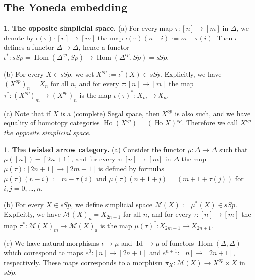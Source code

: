 \documentclass[12pt]{amsart}
\theoremstyle{plain}
\theoremstyle{definition}
\newtheorem{Emp}[Thm]{}
\numberwithin{equation}{section}
\newcommand{\cal}[1]{\mathcal{#1}}
\newcommand{\C}[1]{\cal#1}
\newcommand{\Dt}{\Delta}
\newcommand{\Ho}{\operatorname{Ho}}
\newcommand{\Id}{\operatorname{Id}}
\newcommand{\Hom}{\operatorname{Hom}}
\begin{document}
\subsection{The Yoneda embedding}
\begin{Emp} \label{E:opp}
{\bf The opposite simplicial space.} (a) For every map 
$\tau:[n]\to[m]$ in $\Dt$, we denote by $\iota(\tau):[n]\to[m]$
the map $\iota(\tau)(n-i):=m-\tau(i)$. Then $\iota$ defines a
functor $\Dt\to\Dt$, hence a functor
$\iota^*:sSp=\Hom(\Dt^{op},Sp)\to \Hom(\Dt^{op},Sp)=sSp$.

(b) For every  $X\in sSp$, we set $X^{op}:=\iota^*(X)\in sSp$.
Explicitly, we have $(X^{op})_{n}=X_n$ for all $n$, and for every
$\tau:[n]\to[m]$ the map $\tau^*:(X^{op})_{m}\to (X^{op})_{n}$ is
the map $\iota(\tau)^*:X_m\to X_n$.

(c) Note that if $X$ is a (complete) Segal space, then $X^{op}$ 
is also such, and we have equality of homotopy categories $\Ho
(X^{op})=(\Ho X)^{op}$. Therefore we call $X^{op}$ {\em the
opposite simplicial space}.
\end{Emp}

\begin{Emp} \label{E:catmor}
{\bf The twisted arrow category.} (a) Consider the functor
$\mu:\Dt\to\Dt$ such that $\mu([n])=[2n+1]$, and for every
$\tau:[n]\to[m]$ in $\Dt$ the map $\mu(\tau):[2n+1]\to[2m+1]$ is
defined by formulas $\mu(\tau)(n-i):=m-\tau(i)$ and
$\mu(\tau)(n+1+j)=(m+1+\tau(j))$ for $i,j=0,\ldots,n$.

(b)  For every  $X\in sSp$, we define simplicial space
$\C{M}(X):=\mu^*(X)\in sSp$. Explicitly, we have
$\C{M}(X)_{n}=X_{2n+1}$ for all $n$, and for every $\tau:[n]\to[m]$
the map $\tau^*:\C{M}(X)_{m}\to \C{M}(X)_{n}$ is the map
$\mu(\tau)^*:X_{2m+1}\to X_{2n+1}$.

(c) We have natural morphisms $\iota\to \mu$ and  $\Id\to\mu$ of
functors $\Hom(\Dt,\Dt)$  which correspond to maps
$e^0:[n]\to[2n+1]$ and $e^{n+1}:[n]\to [2n+1]$, respectively. These 
maps corresponds to a morphism $\pi_X:\C{M}(X)\to X^{op}\times X$
in $sSp$.
\end{Emp}
\end{document}
